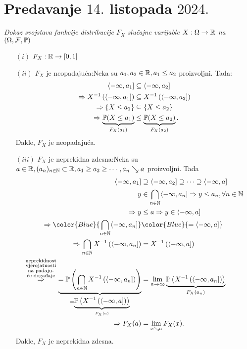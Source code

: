 \documentclass{article}
\begin{document}
\section{Predavanje \(14.\) listopada \(2024.\)}
\textit{Dokaz svojstava funkcije distribucije \(F_X\) slučajne varijable \(X:\Omega\to\Bbb R\) na \((\Omega,\mathcal F,\Bbb P)\)}
\begin{itemize}
    \item[\((i)\)] \(F_X:\Bbb R\to[0,1]\)
    \item[\((ii)\)] \(F_X\) je neopadajuća:\newline Neka su \(a_1,a_2\in\Bbb R,a_1\le a_2\) proizvoljni. Tada: \[\begin{aligned}\langle-\infty,a_1]&\subseteq\langle-\infty,a_2]\\\Rightarrow X^{-1}\left(\langle-\infty,a_1]\right)&\subseteq X^{-1}\left(\langle-\infty,a_2]\right)\\\Rightarrow\{X\le a_1\}&\subseteq\{X\le a_2\}\\\Rightarrow\underbrace{\Bbb P(X\le a_1)}_{F_X(a_1)}&\le\underbrace{\Bbb P(X\le a_2)}_{F_X(a_2)}.\end{aligned}\] Dakle, \(F_X\) je neopadajuća.
    \item[\((iii)\)] \(F_X\) je neprekidna zdesna:\newline Neka su \(a\in\Bbb R, (a_n)_{n\in\Bbb N}\subset\Bbb R, a_1\ge a_2\ge \cdots, a_n\searrow a\) proizvoljni. Tada \[\begin{aligned}\langle-\infty,a_1]&\supseteq\langle-\infty,a_2]\supseteq\cdots\supseteq\langle-\infty,a]\\y&\in\bigcap_{n\in\Bbb N}\langle-\infty,a_n]\Rightarrow y\le a_n,\forall n\in\Bbb N\\\Rightarrow y&\le a\Rightarrow y\in\langle-\infty,a]\\\Rightarrow{\color{Blue}{\bigcap_{n\in\Bbb N}\langle-\infty,a_n]}}&{\color{Blue}{=\langle-\infty,a]}}\\\Rightarrow\bigcap_{n\in\Bbb N}X^{-1}\left(\langle-\infty,a_n]\right)&=X^{-1}\left(\langle-\infty,a]\right)\\\overset{\substack{\text{neprekidnost}\\\text{vjerojatnosti}\\\text{na padaju-}\\\text{će doga\dj{}aje}}}{\Rightarrow}\underbrace{=\Bbb P\left(\bigcap_{n\in\Bbb N}X^{-1}\left(\langle-\infty,a_n]\right)\right)}_{=\underbrace{\Bbb P\left(X^{-1}\left(\langle-\infty,a]\right)\right)}_{F_X(a)}}&=\lim_{n\to\infty}\underbrace{\Bbb P\left(X^{-1}\left(\langle-\infty,a_n]\right)\right)}_{F_X(a_n)}\\\Rightarrow F_X(a)&=\lim_{x\searrow a}F_X(x).\end{aligned}\] Dakle, \(F_X\) je neprekidna zdesna. 

\end{itemize}
\end{document}
